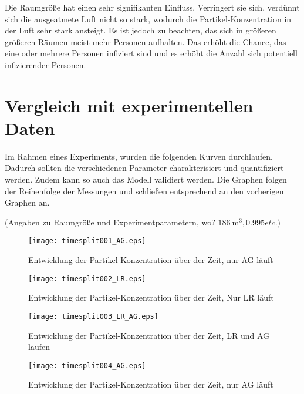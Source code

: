 \documentclass[12pt,a4paper,bibtotocnumbered,liststotocnumbered]{scrreprt}
\begin{document}
Die Raumgröße hat einen sehr signifikanten Einfluss. Verringert sie sich, verdünnt sich die ausgeatmete Luft nicht so stark, wodurch die Partikel-Konzentration in der Luft sehr stark ansteigt. Es ist jedoch zu beachten, das sich in größeren größeren Räumen meist mehr Personen aufhalten. Das erhöht die Chance, das eine oder mehrere Personen infiziert sind und es erhöht die Anzahl sich potentiell infizierender Personen.


\section{Vergleich mit experimentellen Daten}
Im Rahmen eines Experiments, wurden die folgenden Kurven durchlaufen. Dadurch sollten die verschiedenen Parameter charakterisiert und quantifiziert werden. Zudem kann so auch das Modell validiert werden. Die Graphen folgen der Reihenfolge der Messungen und schließen entsprechend an den vorherigen Graphen an.

(Angaben zu Raumgröße und Experimentparametern, wo? $\SI{186}{\cubic\meter}, 0.995 etc. $)

\begin{figure}[H]
\begin{minipage}[t]{0.49\textwidth}
\texttt{[image: timesplit001\_AG.eps]}
\caption{Entwicklung der Partikel-Konzentration über der Zeit, nur AG läuft}
\label{Abb: timesplit001_AG}
\end{minipage}
\begin{minipage}[t]{0.49\textwidth}
\texttt{[image: timesplit002\_LR.eps]}
\caption{Entwicklung der Partikel-Konzentration über der Zeit, Nur LR läuft}
\label{Abb: timesplit002_LR}
\end{minipage}
\begin{minipage}[t]{0.49\textwidth}
\texttt{[image: timesplit003\_LR\_AG.eps]}
\caption{Entwicklung der Partikel-Konzentration über der Zeit, LR und AG laufen}
\label{Abb: timesplit003_LR_AG}
\end{minipage}
\begin{minipage}[t]{0.49\textwidth}
\texttt{[image: timesplit004\_AG.eps]}
\caption{Entwicklung der Partikel-Konzentration über der Zeit, nur AG läuft}
\label{Abb: timesplit004_AG}
\end{minipage}
\end{figure}
\end{document}
